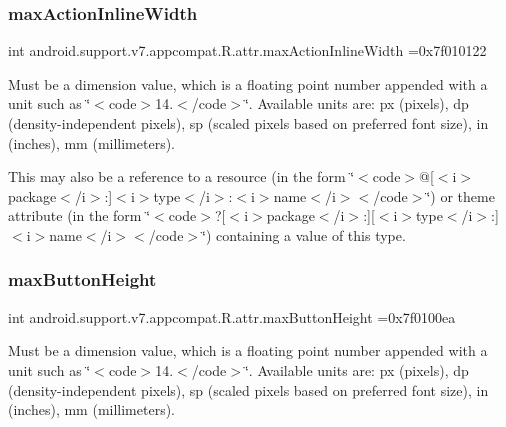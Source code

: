 \subsubsection{\texorpdfstring{max\+Action\+Inline\+Width}{maxActionInlineWidth}}
{\footnotesize\ttfamily int android.\+support.\+v7.\+appcompat.\+R.\+attr.\+max\+Action\+Inline\+Width =0x7f010122\hspace{0.3cm}{\ttfamily [static]}}

Must be a dimension value, which is a floating point number appended with a unit such as \char`\"{}$<$code$>$14.\+5sp$<$/code$>$\char`\"{}. Available units are\+: px (pixels), dp (density-\/independent pixels), sp (scaled pixels based on preferred font size), in (inches), mm (millimeters). 

This may also be a reference to a resource (in the form \char`\"{}$<$code$>$@\mbox{[}$<$i$>$package$<$/i$>$\+:\mbox{]}$<$i$>$type$<$/i$>$\+:$<$i$>$name$<$/i$>$$<$/code$>$\char`\"{}) or theme attribute (in the form \char`\"{}$<$code$>$?\mbox{[}$<$i$>$package$<$/i$>$\+:\mbox{]}\mbox{[}$<$i$>$type$<$/i$>$\+:\mbox{]}$<$i$>$name$<$/i$>$$<$/code$>$\char`\"{}) containing a value of this type. \mbox{\label{classandroid_1_1support_1_1v7_1_1appcompat_1_1R_1_1attr_a68c64276f777b020980f20b3a25352cf}} 
\subsubsection{\texorpdfstring{max\+Button\+Height}{maxButtonHeight}}
{\footnotesize\ttfamily int android.\+support.\+v7.\+appcompat.\+R.\+attr.\+max\+Button\+Height =0x7f0100ea\hspace{0.3cm}{\ttfamily [static]}}

Must be a dimension value, which is a floating point number appended with a unit such as \char`\"{}$<$code$>$14.\+5sp$<$/code$>$\char`\"{}. Available units are\+: px (pixels), dp (density-\/independent pixels), sp (scaled pixels based on preferred font size), in (inches), mm (millimeters). 


